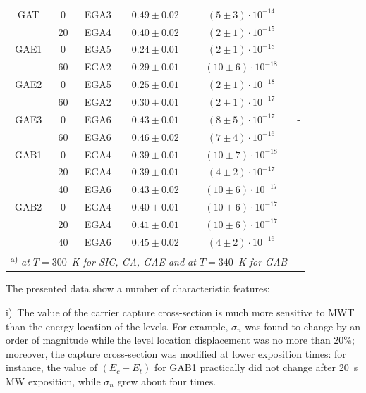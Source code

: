 \documentclass[final,3p,times,twocolumn,authoryear]{elsarticle}
\begin{document}
\begin{table}
\begin{tabular}{ccccccc}
GAT& 0 &EGA3& $0.49\pm0.02$ &$(5\pm3)\cdot10^{-14}$&\multicolumn{2}{c}{}\\ %
& 20 &EGA4& $0.40\pm0.02$ &$(2\pm1)\cdot10^{-15}$&\multicolumn{2}{c}{}\\ %
GAE1& 0 &EGA5& $0.24\pm0.01$ &$(2\pm1)\cdot10^{-18}$&\multicolumn{2}{c}{}\\ %
& 60 &EGA2& $0.29\pm0.01$ &$(10\pm6)\cdot10^{-18}$&\multicolumn{2}{c}{}\\ %
GAE2& 0 &EGA5& $0.25\pm0.01$ &$(2\pm1)\cdot10^{-18}$&\multicolumn{2}{c}{}\\ %
& 60 &EGA2& $0.30\pm0.01$ &$(2\pm1)\cdot10^{-17}$&\multicolumn{2}{c}{}\\ %
GAE3& 0 &EGA6& $0.43\pm0.01$ &$(8\pm5)\cdot10^{-17}$&\multicolumn{2}{c}{-}\\ %
& 60 &EGA6& $0.46\pm0.02$ &$(7\pm4)\cdot10^{-16}$&\multicolumn{2}{c}{}\\ %
GAB1& 0 &EGA4& $0.39\pm0.01$ &$(10\pm7)\cdot10^{-18}$&\multicolumn{2}{c}{}\\ %
& 20 &EGA4& $0.39\pm0.01$ &$(4\pm2)\cdot10^{-17}$&\multicolumn{2}{c}{}\\ %
& 40 &EGA6& $0.43\pm0.02$ &$(10\pm6)\cdot10^{-17}$&\multicolumn{2}{c}{}\\ %
GAB2& 0 &EGA4& $0.40\pm0.01$ &$(10\pm6)\cdot10^{-17}$&\multicolumn{2}{c}{}\\ %
& 20 &EGA4& $0.41\pm0.01$ &$(10\pm6)\cdot10^{-17}$&\multicolumn{2}{c}{}\\ %
& 40 &EGA6& $0.45\pm0.02$ &$(4\pm2)\cdot10^{-16}$&\multicolumn{2}{c}{}\\  %
\multicolumn{6}{l}{\textsuperscript{ a)} \emph{at $T=300$~K for SIC, GA, GAE and at $T=340$~K for GAB}}\\
\hline
\end{tabular}
\end{table}

The presented data show a number of characteristic features:

\noindent
i)~The value of the carrier capture cross-section is much more sensitive to MWT than the energy location of the levels.
For example, $\sigma_n$ was found to change by an order of magnitude while the level location displacement was no more than 20\%;
moreover, the capture cross-section was modified at lower exposition times:
for instance, the value of $(E_c-E_t)$ for GAB1 practically did not change after 20~s MW exposition, while $\sigma_n$ grew about four times.
\end{document}
